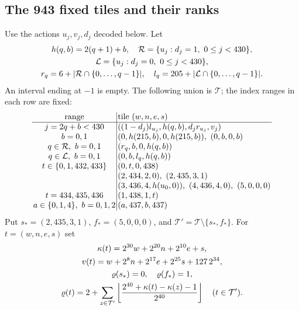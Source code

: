 \subsection{The 943 fixed tiles and their ranks}
Use the actions $u_j,v_j,d_j$ decoded below. Let
\[
\begin{gathered}
h(q,b)=2(q+1)+b,\quad
\mathcal R=\{u_j:d_j=1,\ 0\le j<430\},\\
\mathcal L=\{u_j:d_j=0,\ 0\le j<430\},\\
r_q=6+|\mathcal R\cap\{0,\ldots,q-1\}|,\quad
l_q=205+|\mathcal L\cap\{0,\ldots,q-1\}|.
\end{gathered}
\]
An interval ending at $-1$ is empty. The following union is $\mathcal T$;
the index ranges in each row are fixed:
\[
\setlength{\arraycolsep}{1.4pt}\begin{array}{c|l}
\text{range}&\text{tile }(w,n,e,s)\\\hline
j=2q+b<430&((1-d_j)l_{u_j},h(q,b),d_jr_{u_j},v_j)\\
b=0,1&(0,h(215,b),0,h(215,b)),\ (0,b,0,b)\\
q\in\mathcal R,\ b=0,1&(r_q,b,0,h(q,b))\\
q\in\mathcal L,\ b=0,1&(0,b,l_q,h(q,b))\\
t\in\{0,1,432,433\}&(0,t,0,438)\\
&(2,434,2,0),\ (2,435,3,1)\\
&(3,436,4,h(u_0,0)),\ (4,436,4,0),\ (5,0,0,0)\\
t=434,435,436&(1,438,1,t)\\
a\in\{0,1,4\},\ b=0,1,2&(a,437,b,437)
\end{array}
\]
Put $s_*=(2,435,3,1)$, $f_*=(5,0,0,0)$, and $\mathcal T'=\mathcal T\setminus\{s_*,f_*\}$.
For $t=(w,n,e,s)$ set
\[
\begin{gathered}
\kappa(t)=2^{30}w+2^{20}n+2^{10}e+s,\\
v(t)=w+2^8n+2^{17}e+2^{25}s+127\,2^{34},\\
\varrho(s_*)=0,\quad\varrho(f_*)=1,\\
\varrho(t)=2+\sum_{z\in\mathcal T'}
 \left\lfloor\frac{2^{40}+\kappa(t)-\kappa(z)-1}{2^{40}}\right\rfloor
 \quad(t\in\mathcal T').
\end{gathered}
\]

